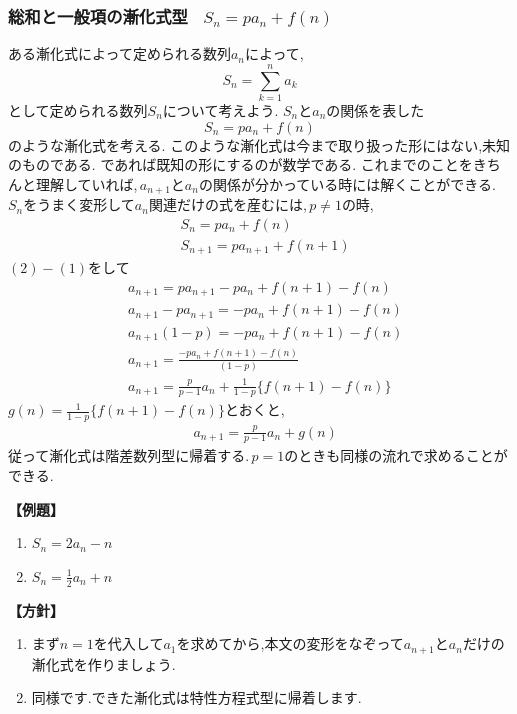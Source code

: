 
\subsubsection{総和と一般項の漸化式型 \, $S_n=pa_n+f(n)$}
ある漸化式によって定められる数列$a_n$によって,
\[
  S_n=\sum_{k=1}^{n} a_k
\]
として定められる数列$S_n$について考えよう.
$S_n$と$a_n$の関係を表した
\[
  S_n=pa_n+f(n)
\]
のような漸化式を考える.
このような漸化式は今まで取り扱った形にはない,未知のものである.
であれば既知の形にするのが数学である.
これまでのことをきちんと理解していれば,\,$a_{n+1}$と$a_n$の関係が分かっている時には解くことができる.
$S_n$をうまく変形して$a_{n}$関連だけの式を産むには,\,$p \neq 1$の時,
\begin{align*}
  & S_n=pa_n+f(n) \tag{1}           \\
   & S_{n+1}=pa_{n+1}+f(n+1) \tag{2}
\end{align*}
$(2)-(1)$をして
\begin{align*}
   & a_{n+1}=pa_{n+1}-pa_n+f(n+1)-f(n)                     \\
   & a_{n+1}-pa_{n+1}=-pa_n+f(n+1)-f(n)                    \\
   & a_{n+1}(1-p)=-pa_n+f(n+1)-f(n)                        \\
   & a_{n+1}=\frac{-pa_n+f(n+1)-f(n)}{(1-p)}               \\
   & a_{n+1}=\frac{p}{p-1}a_n+\frac{1}{1-p}\{f(n+1)-f(n)\}
\end{align*}
$\displaystyle g(n)=\frac{1}{1-p}\{f(n+1)-f(n)\}$とおくと,
\begin{align*}
   & a_{n+1}=\frac{p}{p-1}a_n+g(n)
\end{align*}
従って漸化式は階差数列型に帰着する.\,$p=1$のときも同様の流れで求めることができる.

\noindent \textbf{【例題】}
\begin{enumerate}[label=(\arabic*),parsep=3pt]
  \item $\displaystyle S_n=2a_n-n$
  \item $\displaystyle S_n=\frac12a_n+n$
\end{enumerate}

\noindent\textbf{【方針】}
\begin{enumerate}[label=(\arabic*),parsep=3pt]
  \item まず$n=1$を代入して$a_1$を求めてから,本文の変形をなぞって$a_{n+1}$と$a_n$だけの漸化式を作りましょう.
  \item 同様です.できた漸化式は特性方程式型に帰着します.
\end{enumerate}

